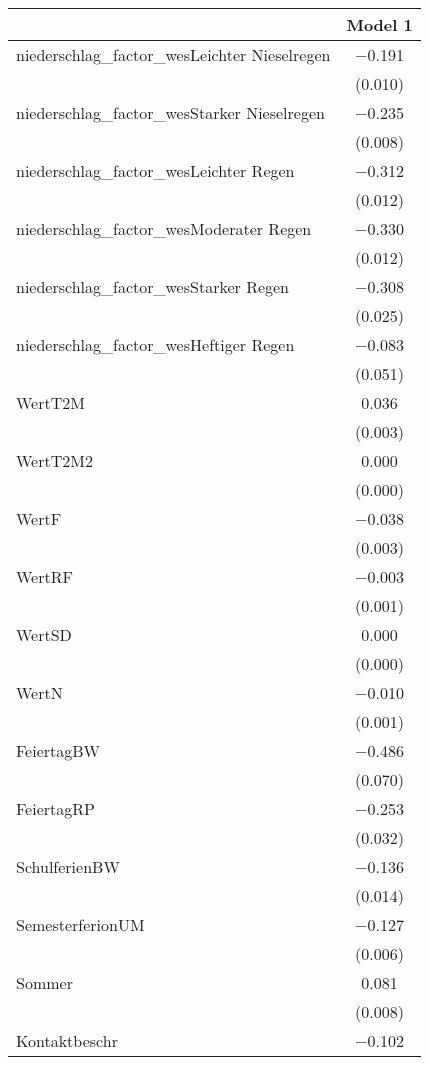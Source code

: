 \begin{table}
\centering
\begin{tabular}[t]{lc}
\toprule
  & Model 1\\
\midrule
niederschlag\_factor\_wesLeichter Nieselregen & \num{-0.191}\\
 & (\num{0.010})\\
niederschlag\_factor\_wesStarker Nieselregen & \num{-0.235}\\
 & \vphantom{1} (\num{0.008})\\
niederschlag\_factor\_wesLeichter Regen & \num{-0.312}\\
 & \vphantom{1} (\num{0.012})\\
niederschlag\_factor\_wesModerater Regen & \num{-0.330}\\
 & (\num{0.012})\\
niederschlag\_factor\_wesStarker Regen & \num{-0.308}\\
 & (\num{0.025})\\
niederschlag\_factor\_wesHeftiger Regen & \num{-0.083}\\
 & (\num{0.051})\\
WertT2M & \num{0.036}\\
 & \vphantom{1} (\num{0.003})\\
WertT2M2 & \num{0.000}\\
 & \vphantom{1} (\num{0.000})\\
WertF & \num{-0.038}\\
 & (\num{0.003})\\
WertRF & \num{-0.003}\\
 & \vphantom{1} (\num{0.001})\\
WertSD & \num{0.000}\\
 & (\num{0.000})\\
WertN & \num{-0.010}\\
 & (\num{0.001})\\
FeiertagBW & \num{-0.486}\\
 & (\num{0.070})\\
FeiertagRP & \num{-0.253}\\
 & (\num{0.032})\\
SchulferienBW & \num{-0.136}\\
 & (\num{0.014})\\
SemesterferionUM & \num{-0.127}\\
 & (\num{0.006})\\
Sommer & \num{0.081}\\
 & (\num{0.008})\\
Kontaktbeschr & \num{-0.102}\\

\end{tabular}
\end{table}
